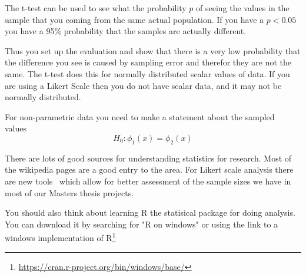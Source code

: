 The t-test can be used to see what the probability $p$ of seeing the values in the sample that you coming from the same actual population. If you have a $p<0.05$ you have a 95\% probability that the samples are actually different.

Thus you set up the evaluation and show that there is a very low probability that the difference you see is caused by sampling error and therefor they are not the same.  The t-test does this for normally distributed scalar values of data. If you are using a Likert Scale then you do not have scalar data, and it may not be normally distributed.

For non-parametric data you need to make a statement about the sampled values~\cite{Kaptein2010}
\begin{equation} 
\label{H0sample}
    H_0 : \phi_1(x) = \phi_2(x)
\end{equation}

There are lots of good sources for understanding statistics for research.  Most of the wikipedia pages are a good entry to the area. For Likert scale analysis there are new tools~\cite{Kaptein2010} which allow for better assessment of the sample sizes we have in most of our Masters thesis projects.

You should also think about learning R the statisical package for doing analysis.  You can download it by searching for "R on windows" or using the link to a windows implementation of R\footnote{\url{https://cran.r-project.org/bin/windows/base/}}


